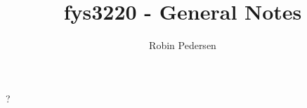 \documentclass{article}
\begin{document}
  \title{fys3220 - General Notes}
  \author{Robin Pedersen}
  \maketitle

  ?
\end{document}
